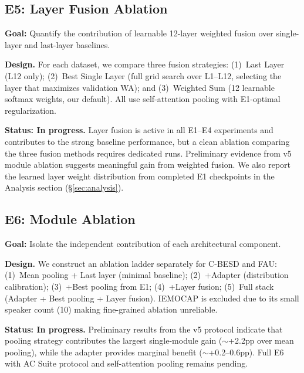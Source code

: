 \documentclass[11pt,a4paper]{article}
\begin{document}
\subsection{E5: Layer Fusion Ablation}
\label{ssec:e5}

\textbf{Goal:} Quantify the contribution of learnable 12-layer weighted fusion
over single-layer and last-layer baselines.

\textbf{Design.} For each dataset, we compare three fusion strategies:
(1)~Last Layer (L12 only); (2)~Best Single Layer (full grid search over
L1--L12, selecting the layer that maximizes validation WA); and
(3)~Weighted Sum (12 learnable softmax weights, our default). All use
self-attention pooling with E1-optimal regularization.

\textbf{Status: In progress.} Layer fusion is active in all E1--E4 experiments
and contributes to the strong baseline performance, but a clean ablation
comparing the three fusion methods requires dedicated runs. Preliminary
evidence from v5 module ablation suggests meaningful gain from weighted fusion.
We also report the learned layer weight distribution from completed E1
checkpoints in the Analysis section (\S\ref{sec:analysis}).

\subsection{E6: Module Ablation}
\label{ssec:e6}

\textbf{Goal:} Isolate the independent contribution of each architectural
component.

\textbf{Design.} We construct an ablation ladder separately for C-BESD and FAU:
(1)~Mean pooling + Last layer (minimal baseline); (2)~+Adapter (distribution
calibration); (3)~+Best pooling from E1; (4)~+Layer fusion; (5)~Full stack
(Adapter + Best pooling + Layer fusion). IEMOCAP is excluded due to its small
speaker count (10) making fine-grained ablation unreliable.

\textbf{Status: In progress.} Preliminary results from the v5 protocol
indicate that pooling strategy contributes the largest single-module gain
($\sim$+2.2pp over mean pooling), while the adapter provides marginal benefit
($\sim$+0.2--0.6pp). Full E6 with AC Suite protocol and self-attention pooling
remains pending.

\end{document}
